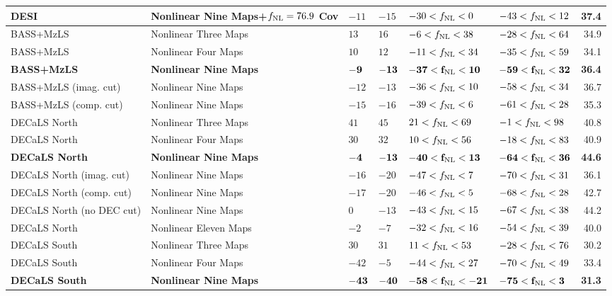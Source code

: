 \begin{table}
{\begin{tabular}{llllllr}
DESI & Nonlinear Nine Maps+$f_{\rm NL}=76.9$ Cov& $   -11$& $   -15$& $   -30<f_{\rm NL}<    0$& $   -43<f_{\rm NL}<    12$ &   37.4\\
   \hline
BASS+MzLS & Nonlinear Three Maps        & $    13$& $    16$& $    -6<f_{\rm NL}<    38$& $   -28<f_{\rm NL}<    64$ &   34.9\\
BASS+MzLS & Nonlinear Four Maps         & $    10$& $    12$& $   -11<f_{\rm NL}<    34$& $   -35<f_{\rm NL}<    59$ &   34.1\\
\bf{BASS+MzLS} & \bf{Nonlinear Nine Maps}         & $    \bf{-9}$& $   \bf{-13}$& $   \bf{-37}<f_{\rm NL}<    \bf{10}$& $   \bf{-59}<f_{\rm NL}<    \bf{32}$ &   \bf{36.4}\\
BASS+MzLS (imag. cut) & Nonlinear Nine Maps& $   -12$& $   -13$& $   -36<f_{\rm NL}<    10$& $   -58<f_{\rm NL}<    34$ &   36.7\\
BASS+MzLS (comp. cut) & Nonlinear Nine Maps& $   -15$& $   -16$& $   -39<f_{\rm NL}<     6$& $   -61<f_{\rm NL}<    28$ &   35.3\\
   \hline
DECaLS North & Nonlinear Three Maps     & $    41$& $    45$& $    21<f_{\rm NL}<    69$& $    -1<f_{\rm NL}<    98$ &   40.8\\
DECaLS North & Nonlinear Four Maps      & $    30$& $    32$& $    10<f_{\rm NL}<    56$& $   -18<f_{\rm NL}<    83$ &   40.9\\
\bf{DECaLS North} & \bf{Nonlinear Nine Maps}      & $    \bf{-4}$& $ \bf{-13}$& $  \bf{-40}<f_{\rm NL}<   \bf{13}$& $   \bf{-64}<f_{\rm NL}<   \bf{36}$ &  \bf{44.6}\\
DECaLS North (imag. cut) & Nonlinear Nine Maps& $   -16$& $   -20$& $   -47<f_{\rm NL}<     7$& $   -70<f_{\rm NL}<    31$ &   36.1\\
DECaLS North (comp. cut) & Nonlinear Nine Maps& $   -17$& $   -20$& $   -46<f_{\rm NL}<     5$& $   -68<f_{\rm NL}<    28$ &   42.7\\
DECaLS North (no DEC cut) & Nonlinear Nine Maps& $     0$& $   -13$& $   -43<f_{\rm NL}<    15$& $   -67<f_{\rm NL}<    38$ &   44.2\\
DECaLS North & Nonlinear Eleven Maps        & $    -2$& $    -7$& $   -32<f_{\rm NL}<    16$& $   -54<f_{\rm NL}<    39$ &   40.0\\
   \hline
DECaLS South & Nonlinear Three Maps     & $    30$& $    31$& $    11<f_{\rm NL}<    53$& $   -28<f_{\rm NL}<    76$ &   30.2\\
DECaLS South & Nonlinear Four Maps      & $   -42$& $    -5$& $   -44<f_{\rm NL}<    27$& $   -70<f_{\rm NL}<    49$ &   33.4\\
\bf{DECaLS South} & \bf{Nonlinear Nine Maps}      & $   \bf{-43}$& $  \bf{-40}$& $   \bf{-58}<f_{\rm NL}<  \bf{-21}$& $   \bf{-75}<f_{\rm NL}<    \bf{ 3}$ &  \bf{31.3}\\

\end{tabular}}
\end{table}

